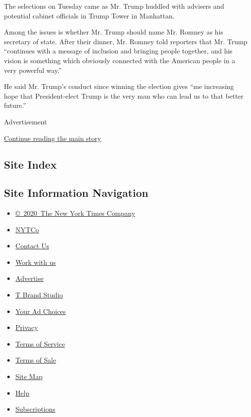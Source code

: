 The selections on Tuesday came as Mr. Trump huddled with advisers and
potential cabinet officials in Trump Tower in Manhattan.

Among the issues is whether Mr. Trump should name Mr. Romney as his
secretary of state. After their dinner, Mr. Romney told reporters that
Mr. Trump ``continues with a message of inclusion and bringing people
together, and his vision is something which obviously connected with the
American people in a very powerful way.''

He said Mr. Trump's conduct since winning the election gives ``me
increasing hope that President-elect Trump is the very man who can lead
us to that better future.''

Advertisement

\protect\hyperlink{after-bottom}{Continue reading the main story}

\hypertarget{site-index}{%
\subsection{Site Index}\label{site-index}}

\hypertarget{site-information-navigation}{%
\subsection{Site Information
Navigation}\label{site-information-navigation}}

\begin{itemize}
\tightlist
\item
  \href{https://help.nytimes.com/hc/en-us/articles/115014792127-Copyright-notice}{©~2020~The
  New York Times Company}
\end{itemize}

\begin{itemize}
\tightlist
\item
  \href{https://www.nytco.com/}{NYTCo}
\item
  \href{https://help.nytimes.com/hc/en-us/articles/115015385887-Contact-Us}{Contact
  Us}
\item
  \href{https://www.nytco.com/careers/}{Work with us}
\item
  \href{https://nytmediakit.com/}{Advertise}
\item
  \href{http://www.tbrandstudio.com/}{T Brand Studio}
\item
  \href{https://www.nytimes.com/privacy/cookie-policy\#how-do-i-manage-trackers}{Your
  Ad Choices}
\item
  \href{https://www.nytimes.com/privacy}{Privacy}
\item
  \href{https://help.nytimes.com/hc/en-us/articles/115014893428-Terms-of-service}{Terms
  of Service}
\item
  \href{https://help.nytimes.com/hc/en-us/articles/115014893968-Terms-of-sale}{Terms
  of Sale}
\item
  \href{https://spiderbites.nytimes.com}{Site Map}
\item
  \href{https://help.nytimes.com/hc/en-us}{Help}
\item
  \href{https://www.nytimes.com/subscription?campaignId=37WXW}{Subscriptions}
\end{itemize}
